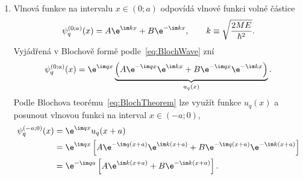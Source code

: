 \begin{solution}
	\begin{enumerate}
	\item
		Vlnová funkce na intervalu $x\in(0;a)$ odpovídá vlnové funkci volné částice
		\begin{equation}
			\psi_{q}^{(0;a)}(x)
                =A\e^{\im k x}+B\e^{-\im k x},\qquad 
            k\equiv\sqrt{\frac{2ME}{\hbar^{2}}}.
		\end{equation}
        Vyjádřená v Blochově formě podle~\eqref{eq:BlochWave} zní
        \begin{equation}
			\psi_{q}^{(0;a)}(x)
                =\e^{\im q x}\underbrace{\left(A\e^{-\im q x}\e^{\im k x}+B\e^{-\im q x}\e^{-\im k x}\right)}_{u_{q}(x)}.
        \end{equation}
        Podle Blochova teorému~\eqref{eq:BlochTheorem} lze využít  funkce $u_{q}(x)$ a posunout vlnovou funkci na interval $x\in(-a;0)$,
        \begin{align}
            \psi_{q}^{(-a;0)}(x)
                &=\e^{\im qx}u_{q}(x+a)\nonumber\\
                &=\e^{\im qx}\left[A\e^{-\im q(x+a)}\e^{\im k(x+a)}+B\e^{-\im q(x+a)}\e^{-\im k(x+a)}\right]\nonumber\\
                &=\e^{-\im qa}\left[A\e^{\im k(x+a)}+B\e^{-\im k(x+a)}\right].
        \end{align}


\end{enumerate}
\end{solution}
